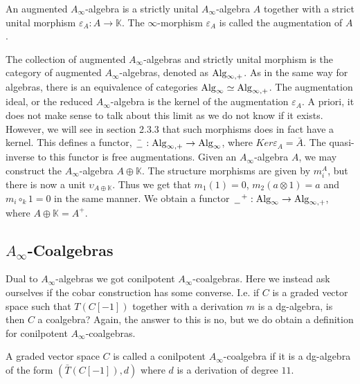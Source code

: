 \documentclass[../thesis.tex]{subfiles}
\begin{document}
        \begin{definition}\label{def: augmented-sha}
            An augmented $A_\infty$-algebra is a strictly unital $A_\infty$-algebra $A$ together with a strict unital morphism $\varepsilon_A : A \rightarrow \mathbb{K}$. The $\infty$-morphism $\varepsilon_A$ is called the augmentation of $A$.
        \end{definition}

        The collection of augmented $A_\infty$-algebras and strictly unital morphism is the category of augmented $A_\infty$-algebras, denoted as $\tt{Alg}_{\infty,+}$. As in the same way for algebras, there is an equivalence of categories $\tt{Alg}_\infty \simeq \tt{Alg}_{\infty,+}$. The augmentation ideal, or the reduced $A_\infty$-algebra is the kernel of the augmentation $\varepsilon_A$. A priori, it does not make sense to talk about this limit as we do not know if it exists. However, we will see in section 2.3.3 that such morphisms does in fact have a kernel. This defines a functor, $\bar{\argument} : \tt{Alg}_{\infty ,+} \rightarrow \tt{Alg}_\infty$, where $Ker\varepsilon_A = \bar{A}$. The quasi-inverse to this functor is free augmentations. Given an $A_\infty$-algebra $A$, we may construct the $A_\infty$-algebra $A\oplus \mathbb{K}$. The structure morphisms are given by $m_i^A$, but there is now a unit $\upsilon_{A\oplus\mathbb{K}}$. Thus we get that $m_1(1) = 0$, $m_2 (a\otimes 1) = a$ and $m_i \circ_k 1 = 0$ in the same manner. We obtain a functor $\argument^+ : \tt{Alg}_\infty \rightarrow \tt{Alg}_{\infty, +}$, where $A\oplus \mathbb{K} = A^+$.

    \subsection{$A_\infty$-Coalgebras}    
        Dual to $A_\infty$-algebras we got conilpotent $A_\infty$-coalgebras. Here we instead ask ourselves if the cobar construction has some converse. I.e. if $C$ is a graded vector space such that $T(C[-1])$ together with a derivation $m$ is a dg-algebra, is then $C$ a coalgebra? Again, the answer to this is no, but we do obtain a definition for conilpotent $A_\infty$-coalgebras.

        \begin{definition}
            A graded vector space $C$ is called a conilpotent $A_\infty$-coalgebra if it is a dg-algebra of the form $(\bar{T}(C[-1]), d)$ where $d$ is a derivation of degree $11$.
        \end{definition}
\end{document}
